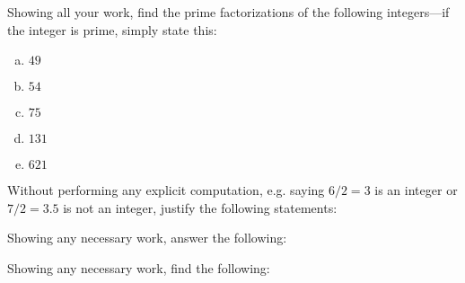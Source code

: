 \documentclass[12pt,letterpaper]{exam}
\begin{document}
\begin{questions}
\newpage
\question[10] Showing all your work, find the prime factorizations of the following integers---if the integer is prime, simply state this:
	\begin{enumerate}[(a)]
	\item $49$
	\item $54$
	\item $75$
	\item $131$
	\item $621$
	\end{enumerate}



\newpage
\question Without performing any explicit computation, e.g. saying $6/2= 3$ is an integer or $7/2= 3.5$ is not an integer, justify the following statements:



\newpage
\question  Showing any necessary work, answer the following:



\newpage
\question Showing any necessary work, find the following:
	\begin{parts}

\end{parts}
\end{questions}
\end{document}
